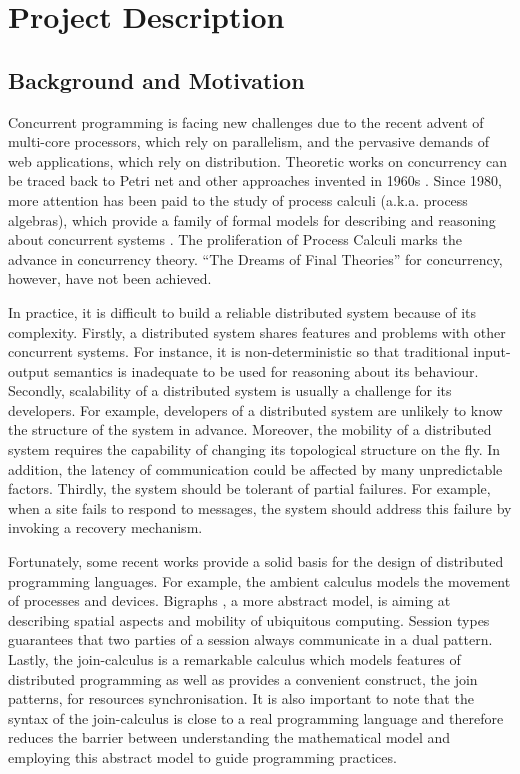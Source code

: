 \section{Project Description}

\subsection{Background and Motivation}

Concurrent programming is facing new challenges due to the recent advent of multi-core processors, which rely on parallelism, and the pervasive demands of web applications, which rely on distribution.  Theoretic works on concurrency can be traced back to Petri net and other approaches invented in 1960s \cite{historyPA}.  Since 1980, more attention has been paid to the study of process calculi (a.k.a. process algebras), which provide a family of formal models for describing and reasoning about concurrent systems \cite{abramsky}.  The proliferation of Process Calculi marks the advance in concurrency theory.  ``The Dreams of Final Theories'' \cite{abramsky} for concurrency, however, have not been achieved.

In practice, it is difficult to build a reliable distributed system because of its complexity.  Firstly, a distributed system shares features and problems with other concurrent systems.  For instance, it is non-deterministic so that traditional input-output semantics is inadequate to be used for reasoning about its behaviour.  Secondly, scalability of a distributed system is usually a challenge for its developers.  For example, developers of a distributed system are unlikely to know the structure of the system in advance.  Moreover, the mobility \cite{MobileAmbients} of a distributed system requires the capability of changing its topological structure on the fly.  In addition, the latency of communication could be affected by many unpredictable factors.  Thirdly, the system should be tolerant of partial failures.  For example, when a site fails to respond to messages,  the system should address this failure by invoking a recovery mechanism.   	

Fortunately, some recent works provide a solid basis for the design of distributed programming languages.  For example, the ambient calculus \cite{MobileAmbients} models the movement of processes and devices.  Bigraphs \cite{bigraph_book}, a more abstract model, is aiming at describing spatial aspects and mobility of ubiquitous computing.  Session types \cite{Honda93typesfor, Honda_languageprimitives} guarantees that two parties of a session always communicate in a dual pattern.  Lastly, the join-calculus \cite{full_join} is a remarkable calculus which models features of distributed programming as well as provides a convenient construct, the join patterns, for resources synchronisation.  It is also important to note that the syntax of the join-calculus is close to a real programming language and therefore reduces the barrier between understanding the mathematical model and employing this abstract model to guide programming practices.

